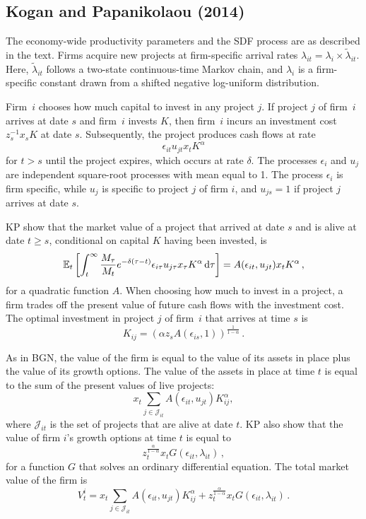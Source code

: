 \documentclass[12pt]{scrarticle}
\begin{document}
\begin{appendices}
\section{Kogan and Papanikolaou (2014)}

The economy-wide productivity parameters and the SDF process are as described in the text.  Firms acquire new projects at firm-specific arrival rates $\lambda_{it} = \lambda_i \times \tilde \lambda_{it}.$ Here, $\tilde \lambda_{it}$ follows a two-state continuous-time Markov chain, and $\lambda_i$ is a firm-specific constant drawn from a shifted negative log-uniform distribution. 

Firm~$i$ chooses how much capital to invest in any project $j$.  If project $j$ of firm~$i$ arrives at date $s$ and firm~$i$ invests $K$, then firm~$i$ incurs an investment cost $z_s^{-1} x_s K$ at date $s$.  Subsequently, the project produces cash flows at rate 
$$\epsilon_{it} u_{jt} x_t K^{\alpha}$$
for $t>s$ until the project expires, which occurs at rate $\delta.$  The processes $\epsilon_{i}$ and $u_{j}$ are independent square-root processes with mean equal to 1. The process  $\epsilon_{i}$ is firm specific, while $u_{j}$ is specific to project $j$ of firm $i$, and $u_{js}=1$ if project $j$ arrives at date $s$.

KP show that the market value of a project that arrived at date $s$ and is alive at date $t \ge s$, conditional on capital $K$ having been invested, is 
\[
\mathbb{E}_t \left[\int_{t}^{\infty}  \frac{M_\tau}{M_t} e^{- \delta(\tau - t)}\epsilon_{i\tau} u_{j\tau} x_\tau K^{\alpha} \,\mathrm{d} \tau \right] = A(\epsilon_{it}, u_{jt}) x_t K^{\alpha}\,,
\]
for a quadratic function $A$. When choosing how much to invest in a project, a firm trades off the present value of future cash flows with the investment cost. The optimal investment in project $j$ of firm~$i$ that arrives at time $s$ is 
\[
K_{ij} = (\alpha z_s A(\epsilon_{is}, 1))^{\frac{1}{1 - \alpha}}\,.
\]

As in BGN, the value of the firm is equal to the value of its assets in place plus the value of its growth options. The value of the assets in place at time $t$ is equal to the sum of the present values of live projects: 
\[
x_t \sum_{ j \in \mathcal J_{it}} A(\epsilon_{it}, u_{jt}) K_{ij}^{\alpha},
\]
where $\mathcal J_{it}$ is the set of projects that are alive at date $t$. 
KP also show that the value of firm $i$'s growth options at time $t$ is equal to 
\[z_t^{\frac{\alpha}{1 - \alpha}} x_t G(\epsilon_{it}, \lambda_{it})\,,
\]
for a function $G$ that solves an ordinary differential equation. The total market value of the firm is 
\[
V^i_t = x_t \sum_{ j \in \mathcal J_{it}} A(\epsilon_{it}, u_{j t}) K_{ij}^{\alpha} + z_t^{\frac{\alpha}{1 - \alpha}} x_t G(\epsilon_{it}, \lambda_{it})\,.
\] 


\end{appendices}
\end{document}
